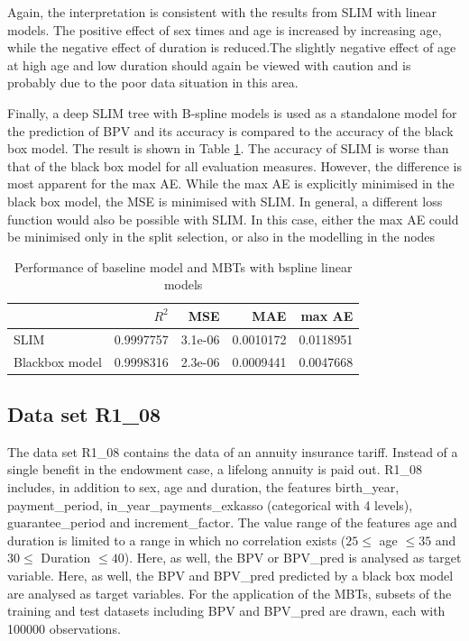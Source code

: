 Again, the interpretation is consistent with the results from SLIM with linear models. The positive effect of sex times and age is increased by increasing age, while the negative effect of duration is reduced.The slightly negative effect of age at high age and low duration should again be viewed with caution and is probably due to the poor data situation in this area.


Finally, a deep SLIM tree with B-spline models is used as a standalone model for the prediction of BPV and its accuracy is compared to the accuracy of the black box model. The result is shown in Table \ref{tab:ins_k2204_standalone_slim}.
The accuracy of SLIM is worse than that of the black box model for all evaluation measures. However, the difference is most apparent for the max AE. While the max AE is explicitly minimised in the black box model, the MSE is minimised with SLIM. In general, a different loss function would also be possible with SLIM. In this case, either the max AE could be minimised only in the split selection, or also in the modelling in the nodes

\begin{table}[!htb]

\caption{Performance of baseline model and MBTs with bspline linear models}
\centering
\begin{tabular}[t]{l|r|r|r|r}
\hline
  & $R^2$ & MSE & MAE & max AE \\
\hline
SLIM & 0.9997757 & 3.1e-06 & 0.0010172 & 0.0118951\\
Blackbox model & 0.9998316 & 2.3e-06 & 0.0009441 & 0.0047668\\
\hline
\end{tabular}
\label{tab:ins_k2204_standalone_slim}
\end{table}








\subsection{Data set R1\_08}

The data set R1\_08 contains the data of an annuity insurance tariff. Instead of a single benefit in the endowment case, a lifelong annuity is paid out.
R1\_08 includes, in addition to sex, age and duration, the features birth\_year, payment\_period, in\_year\_payments\_exkasso (categorical with 4 levels), guarantee\_period and increment\_factor.
The value range of the features age and duration is limited to a range in which no correlation exists ($25 \leq$ age $\leq 35$ and $30 \leq$ Duration $\leq 40$).
Here, as well, the BPV or BPV\_pred is analysed as target variable. Here, as well, the BPV and BPV\_pred predicted by a black box model are analysed as target variables.
For the application of the MBTs, subsets of the training and test datasets including BPV and BPV\_pred are drawn, each with 100000 observations.

